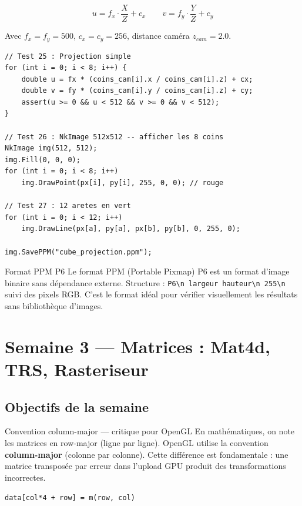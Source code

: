 \documentclass[12pt,a4paper]{report}
\begin{document}
\begin{equation}
    u = f_x \cdot \frac{X}{Z} + c_x
    \qquad
    v = f_y \cdot \frac{Y}{Z} + c_y
\end{equation}

Avec $f_x = f_y = 500$, $c_x = c_y = 256$, distance caméra $z_{cam} = 2.0$.

\begin{lstlisting}[caption={Projection perspective simple}]
// Test 25 : Projection simple
for (int i = 0; i < 8; i++) {
    double u = fx * (coins_cam[i].x / coins_cam[i].z) + cx;
    double v = fy * (coins_cam[i].y / coins_cam[i].z) + cy;
    assert(u >= 0 && u < 512 && v >= 0 && v < 512);
}

// Test 26 : NkImage 512x512 -- afficher les 8 coins
NkImage img(512, 512);
img.Fill(0, 0, 0);
for (int i = 0; i < 8; i++)
    img.DrawPoint(px[i], py[i], 255, 0, 0); // rouge

// Test 27 : 12 aretes en vert
for (int i = 0; i < 12; i++)
    img.DrawLine(px[a], py[a], px[b], py[b], 0, 255, 0);

img.SavePPM("cube_projection.ppm");
\end{lstlisting}

\begin{infobox}{Format PPM P6}
Le format PPM (Portable Pixmap) P6 est un format d'image binaire sans
dépendance externe. Structure : \texttt{P6\textbackslash n largeur
hauteur\textbackslash n 255\textbackslash n} suivi des pixels RGB.
C'est le format idéal pour vérifier visuellement les résultats sans
bibliothèque d'images.
\end{infobox}

\newpage

\chapter*{Semaine 3 --- Matrices : Mat4d, TRS, Rasteriseur}
\section*{Objectifs de la semaine}

\begin{theorybox}{Convention column-major --- critique pour OpenGL}
En mathématiques, on note les matrices en row-major (ligne par ligne).
OpenGL utilise la convention \textbf{column-major} (colonne par colonne).
Cette différence est fondamentale : une matrice transposée par erreur
dans l'upload GPU produit des transformations incorrectes.
\begin{center}
\texttt{data[col*4 + row] = m(row, col)}
\end{center}
\end{theorybox}
\end{document}
